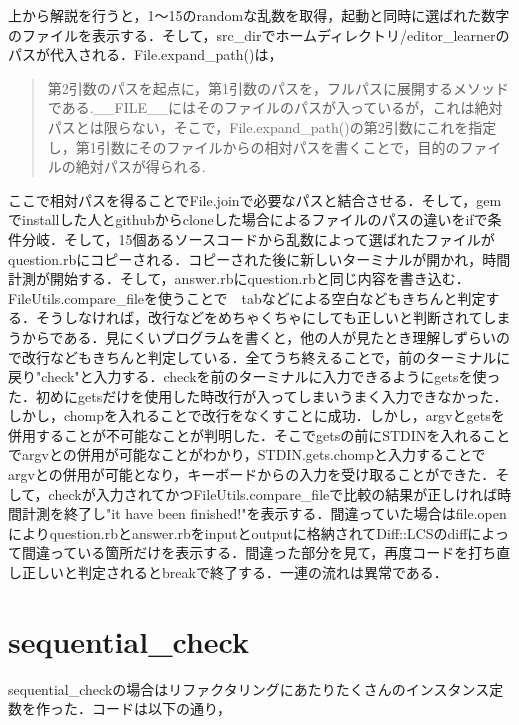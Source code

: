 上から解説を行うと，1〜15のrandomな乱数を取得，起動と同時に選ばれた数字のファイルを表示する．そして，src\_dirでホームディレクトリ/editor\_learnerのパスが代入される．File.expand\_path()は，
\begin{quotation}
第2引数のパスを起点に，第1引数のパスを，フルパスに展開するメソッドである.\_\_FILE\_\_にはそのファイルのパスが入っているが，これは絶対パスとは限らない，そこで，File.expand\_path()の第2引数にこれを指定し，第1引数にそのファイルからの相対パスを書くことで，目的のファイルの絶対パスが得られる\cite{expand}.
\end{quotation}
ここで相対パスを得ることでFile.joinで必要なパスと結合させる．そして，gemでinstallした人とgithubからcloneした場合によるファイルのパスの違いをifで条件分岐．そして，15個あるソースコードから乱数によって選ばれたファイルがquestion.rbにコピーされる．コピーされた後に新しいターミナルが開かれ，時間計測が開始する．そして，answer.rbにquestion.rbと同じ内容を書き込む．FileUtils.compare\_fileを使うことで　tabなどによる空白などもきちんと判定する．そうしなければ，改行などをめちゃくちゃにしても正しいと判断されてしまうからである．見にくいプログラムを書くと，他の人が見たとき理解しずらいので改行などもきちんと判定している．全てうち終えることで，前のターミナルに戻り"check"と入力する．checkを前のターミナルに入力できるようにgetsを使った．初めにgetsだけを使用した時改行が入ってしまいうまく入力できなかった．しかし，chompを入れることで改行をなくすことに成功．しかし，argvとgetsを併用することが不可能なことが判明した．そこでgetsの前にSTDINを入れることでargvとの併用が可能なことがわかり，STDIN.gets.chompと入力することでargvとの併用が可能となり，キーボードからの入力を受け取ることができた．そして，checkが入力されてかつFileUtils.compare\_fileで比較の結果が正しければ時間計測を終了し"it have been finished!"を表示する．間違っていた場合はfile.openによりquestion.rbとanswer.rbをinputとoutputに格納されてDiff::LCSのdiffによって間違っている箇所だけを表示する．間違った部分を見て，再度コードを打ち直し正しいと判定されるとbreakで終了する．一連の流れは異常である．

    \section{sequential\_check}\label{sequential_check}

sequential\_checkの場合はリファクタリングにあたりたくさんのインスタンス定数を作った．コードは以下の通り，

